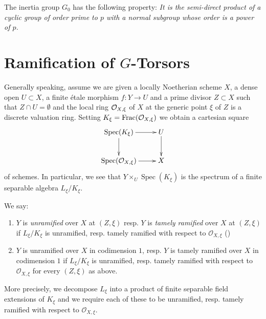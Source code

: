 \begin{prop}
    The inertia group $G_0$ has the following property:
    \textit{It is the semi-direct product of a cyclic group of order prime to $p$ with a normal subgroup whose order is a power of $p$.}
\end{prop}


\section{\texorpdfstring{Ramification of $G$-Torsors}{Ramification of G-Torsors}}\label{section:ramification_of_torsors}

Generally speaking, assume we are given a locally Noetherian scheme $X$,
a dense open $U \subset X$, a finite \'etale morphism $f: Y \to U$ and a prime divisor $Z \subset X$ such that $Z \cap U = \emptyset$
and the local ring $\mathcal{O}_{X, \xi}$ of $X$ at the generic point $\xi$ of $Z$ is a discrete valuation ring.
Setting $K_\xi = \operatorname{Frac}(\mathcal{O}_{X, \xi})$ we obtain a cartesian square
\[ \xymatrix{ \mathop{\mathrm{Spec}}(K_\xi ) \ar[r] \ar[d] & U \ar[d] \\ \mathop{\mathrm{Spec}}(\mathcal{O}_{X, \xi }) \ar[r] & X } \]
of schemes.
In particular, we see that $Y \times _ U \mathop{\mathrm{Spec}}(K_\xi )$ is the spectrum of a finite separable algebra $L_\xi /K_\xi $.
\begin{definition}\label{definition:tamely_ramified_in_codim_1}
We say:
\begin{enumerate}
    \item $Y$ is \textit{unramified} over $X$ at $(Z, \xi)$ resp. $Y$ is \textit{tamely ramified} over $X$ at $(Z, \xi)$
        if $L_\xi /K_\xi $ is unramified, resp. tamely ramified with respect to $\mathcal{O}_{X, \xi }$
        ()

    \item $Y$ is unramified over $X$ in codimension $1$, resp. $Y$ is tamely ramified over $X$ in codimension $1$ if $L_\xi /K_\xi $ is unramified, resp. tamely ramified
    with respect to $\mathcal{O}_{X, \xi }$ for every $(Z, \xi )$ as above.
\end{enumerate}

More precisely, we decompose $L_\xi $ into a product of finite separable field extensions of $K_\xi $ and we require each of these to be unramified, resp. tamely ramified with
respect to $\mathcal{O}_{X, \xi }$.

\end{definition}

